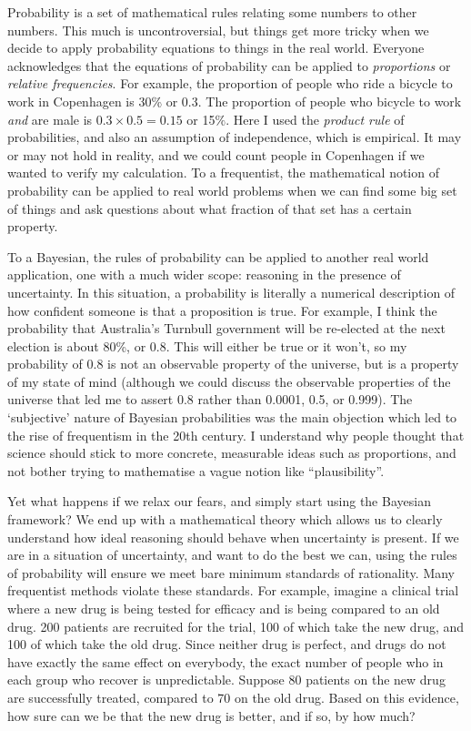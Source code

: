\documentclass[a4paper, 12pt]{article}
\begin{document}
Probability is a set of mathematical rules relating some
numbers to other numbers. This much is uncontroversial, but things get more
tricky when we decide to apply probability equations to things in the real
world. Everyone acknowledges that the equations of probability can be applied
to {\em proportions} or {\em relative frequencies}. For example, the proportion
of people who ride a bicycle to work in Copenhagen is 30\% or 0.3.
The proportion of people who bicycle to work {\em and} are male is
$0.3 \times 0.5 = 0.15$ or 15$\%$. Here I used the {\em product rule} of
probabilities, and also an assumption of independence, which is empirical.
It may or may not hold in reality, and we could count people in Copenhagen if
we wanted to verify my calculation. To a frequentist, the mathematical notion
of probability can be applied to real world problems when we can find some
big set of things and ask questions about what fraction of that set has a
certain property.

To a Bayesian, the rules of probability can be applied to another real world
application, one with a much wider scope: reasoning in the presence of
uncertainty. In this situation, a probability is literally a numerical
description of how confident someone is that a proposition is true. For example,
I think the probability that Australia's Turnbull government will be
re-elected at the next election is about 80\%, or 0.8. This will either be true
or it won't, so my probability of 0.8 is not an observable property of
the universe, but is a property of my state of mind (although we could
discuss the observable properties of the universe that led me to assert 0.8
rather than 0.0001, 0.5, or 0.999). The `subjective' nature of Bayesian
probabilities was the main objection which led to the rise of frequentism in
the 20th century. I understand why people thought that science should stick
to more concrete, measurable ideas such as proportions, and not bother trying
to mathematise a vague notion like ``plausibility''.

Yet what happens if we relax our fears, and simply start using the Bayesian
framework? We end up with a mathematical theory which allows us to clearly
understand how ideal reasoning should behave when uncertainty is present. If we
are in a situation of uncertainty, and want to do the best we can, using the
rules of probability will ensure we meet bare minimum standards of rationality.
Many frequentist methods violate these standards.
For example, imagine a clinical trial where a new drug is being tested for
efficacy and is being compared to an old drug.
200 patients are recruited for the trial, 100
of which take the new drug, and 100 of which take the old drug. Since neither
drug is perfect, and drugs do not have exactly the same effect on everybody,
the exact number of people who in each group who recover is unpredictable.
Suppose 80 patients on the new drug are successfully treated, compared to
70 on the old drug. Based on this evidence, how sure can we be that the new
drug is better, and if so, by how much?
\end{document}
